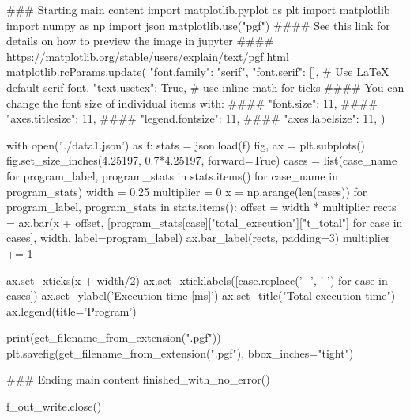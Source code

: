 ### Starting main content
import matplotlib.pyplot as plt
import matplotlib
import numpy as np
import json
matplotlib.use("pgf")
#### See this link for details on how to preview the image in jupyter
#### https://matplotlib.org/stable/users/explain/text/pgf.html
matplotlib.rcParams.update({
  "font.family": "serif",
  "font.serif": [], # Use LaTeX default serif font.
  "text.usetex": True, # use inline math for ticks
  #### You can change the font size of individual items with:
  #### "font.size": 11,
  #### "axes.titlesize": 11,
  #### "legend.fontsize": 11,
  #### "axes.labelsize": 11,
})

with open('../data1.json') as f:
    stats = json.load(f)
fig, ax = plt.subplots()
fig.set_size_inches(4.25197, 0.7*4.25197, forward=True)
cases = list({case_name for program_label, program_stats in stats.items() for case_name in program_stats})
width = 0.25
multiplier = 0
x = np.arange(len(cases))
for program_label, program_stats in stats.items():
    offset = width * multiplier
    rects = ax.bar(x + offset, [program_stats[case]["total_execution"]["t_total"] for case in cases], width, label=program_label)
    ax.bar_label(rects, padding=3)
    multiplier += 1

ax.set_xticks(x + width/2)
ax.set_xticklabels([case.replace('_', '-') for case in cases])
ax.set_ylabel('Execution time [ms]')
ax.set_title("Total execution time")
ax.legend(title='Program')

print(get_filename_from_extension(".pgf"))
plt.savefig(get_filename_from_extension(".pgf"), bbox_inches="tight")




### Ending main content
finished_with_no_error()


f_out_write.close()




